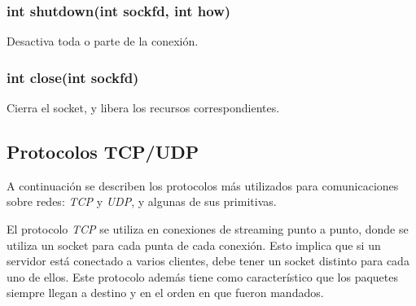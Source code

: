 \documentclass[oneside]{article}
\begin{document}
		\subsubsection{int shutdown(int sockfd, int how)}
		Desactiva toda o parte de la conexión.\\

		\subsubsection{int close(int sockfd)}
		Cierra el socket, y libera los recursos correspondientes.\\

	\subsection{Protocolos TCP/UDP}
		
		A continuación se describen los protocolos más utilizados para comunicaciones sobre redes: \emph{TCP} y \emph{UDP}, y algunas de sus primitivas.
		
		El protocolo \emph{TCP} se utiliza en conexiones de streaming punto a punto, donde se utiliza un socket para cada punta de cada conexión. Esto implica que si un servidor está conectado a varios clientes, debe tener un socket distinto para cada uno de ellos. Este protocolo además tiene como característico que los paquetes siempre llegan a destino y en el orden en que fueron mandados.
		
\end{document}
